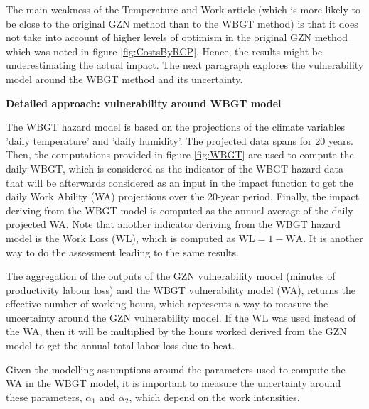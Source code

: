 \documentclass[a4paper,11pt]{extarticle} %
\theoremstyle{definition}
\begin{document}
The main weakness of the Temperature and Work article (which is more likely to be close to the original GZN method than to the WBGT method) is that it does not take into account of higher levels of optimism in the original GZN method which was noted in figure \ref{fig:CostsByRCP}. Hence, the results might be underestimating the actual impact. The next paragraph explores the vulnerability model around the WBGT method and its uncertainty.

\textbf{Detailed approach: vulnerability around WBGT model}

The WBGT hazard model is based on the projections of the climate variables 'daily temperature' and 'daily humidity'. The projected data spans for 20 years. Then, the computations provided in figure \ref{fig:WBGT} are used to compute the daily WBGT, which is considered as the indicator of the WBGT hazard data that will be afterwards considered as an input in the impact function to get the daily Work Ability (WA) projections over the 20-year period. Finally, the impact deriving from the WBGT model is computed as the annual average of the daily projected WA.
Note that another indicator deriving from the WBGT hazard model is the Work Loss (WL), which is computed as $\text{WL} = 1 - \text{WA}$. It is another way to do the assessment leading to the same results.

The aggregation of the outputs of the GZN vulnerability model (minutes of productivity labour loss) and the WBGT vulnerability model (WA), returns the effective number of working hours, which represents a way to measure the uncertainty around the GZN vulnerability model. %
If the WL was used instead of the WA, then it will be multiplied by the hours worked derived from the GZN model to get the annual total labor loss due to heat.

Given the modelling assumptions around the parameters used to compute the WA in the WBGT model, it is important to measure the uncertainty around these parameters, $\alpha_1$ and $\alpha_2$, which depend on the work intensities.
\end{document}
